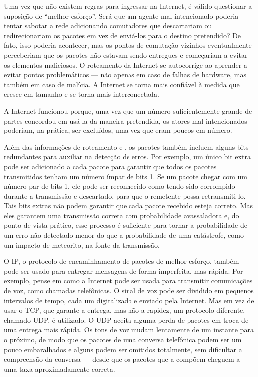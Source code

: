 Uma vez que não existem regras para ingressar na Internet, é válido questionar a suposição
de ``melhor esforço''. Será que um agente mal-intencionado poderia tentar sabotar a rede
adicionando comutadores que descartariam ou redirecionariam os pacotes em vez de enviá-los
para o destino pretendido? De fato, isso poderia acontecer, mas os pontos de comutação
vizinhos eventualmente perceberiam que os pacotes não estavam sendo entregues e começariam
a evitar os elementos maliciosos. O roteamento da Internet se autocorrige ao aprender a
evitar pontos problemáticos --- não apenas em caso de falhas de hardware, mas também em
caso de malícia. A Internet se torna mais confiável à medida que cresce em tamanho e se
torna mais interconectada.

A Internet funcionou porque, uma vez que um número suficientemente grande de partes
concordou em usá-la da maneira pretendida, os atores mal-intencionados poderiam, na prática,
ser excluídos, uma vez que eram poucos em número.

Além das informações de roteamento e , os pacotes também incluem alguns
bits redundantes para auxiliar na detecção de erros. Por exemplo, um único bit extra pode
ser adicionado a cada pacote para garantir que todos os pacotes transmitidos tenham um número
ímpar de bits 1. Se um pacote chegar com um número par de bits 1, ele pode ser reconhecido
como tendo sido corrompido durante a transmissão e descartado, para que o remetente possa
retransmiti-lo. Tais bits extras não podem garantir que cada pacote recebido esteja correto.
Mas eles garantem uma transmissão correta com probabilidade avassaladora e, do ponto de vista
prático, esse processo é suficiente para tornar a probabilidade de um erro não detectado
menor do que a probabilidade de uma catástrofe, como um impacto de meteorito, na fonte da
transmissão.

O IP, o protocolo de encaminhamento de pacotes de melhor esforço, também pode ser usado para
entregar mensagens de forma imperfeita, mas rápida. Por exemplo, pense em como a Internet
pode ser usada para transmitir comunicações de voz, como chamadas telefônicas. O sinal de voz
pode ser dividido em pequenos intervalos de tempo, cada um digitalizado e enviado pela
Internet. Mas em vez de usar o TCP, que garante a entrega, mas não a rapidez, um protocolo
diferente, chamado UDP, é utilizado. O UDP aceita alguma perda de pacotes em troca de uma
entrega mais rápida. Os tons de voz mudam lentamente de um instante para o próximo, de modo
que os pacotes de uma conversa telefônica podem ser um pouco embaralhados e alguns podem ser
omitidos totalmente, sem dificultar a compreensão da conversa --- desde que os pacotes que a
compõem cheguem a uma taxa aproximadamente correta.

